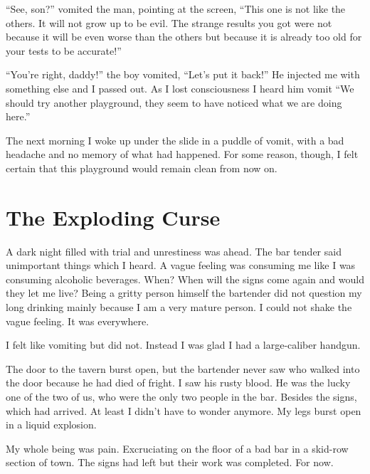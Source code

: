``See, son?'' vomited the man, pointing at the screen,
``This one is not like the others. It will not grow up to be
evil. The strange results you got were not because it will be even
worse than the others but because it is already too old for your
tests to be accurate!''



``You're right, daddy!'' the boy vomited,
``Let's put it back!'' He injected me with
something else and I passed out. As I lost consciousness I heard
him vomit ``We should try another playground, they seem to
have noticed what we are doing here.''



The next morning I woke up under the slide in a puddle of vomit,
with a bad headache and no memory of what had happened. For some
reason, though, I felt certain that this playground would remain
clean from now on. 
 



\chapter{The Exploding Curse}



A dark night filled with trial and unrestiness was ahead. The bar
tender said unimportant things which I heard. A vague feeling was
consuming me like I was consuming alcoholic beverages. When? When
will the signs come again and would they let me live? Being a
gritty person himself the bartender did not question my long
drinking mainly because I am a very mature person. I could not
shake the vague feeling. It was everywhere.



I felt like vomiting but did not. Instead I was glad I had a
large-caliber handgun.



The door to the tavern burst open, but the bartender never saw who
walked into the door because he had died of fright. I saw his rusty
blood. He was the lucky one of the two of us, who were the only two
people in the bar. Besides the signs, which had arrived. At least I
didn't have to wonder anymore. My legs burst open in a liquid
explosion.



My whole being was pain. Excruciating on the floor of a bad bar in
a skid-row section of town. The signs had left but their work was
completed. For now.



